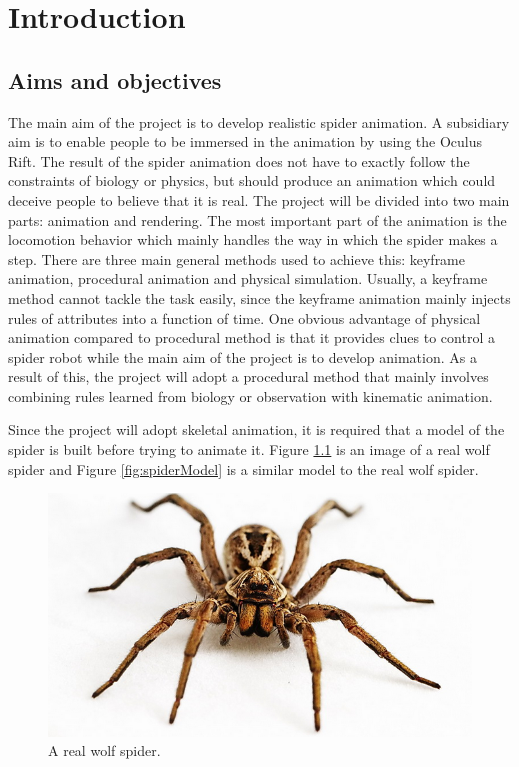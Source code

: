 \chapter{Introduction}
\section{Aims and objectives}
The main aim of the project is to develop realistic spider animation. A subsidiary aim is to enable people to be immersed in the animation by using the Oculus Rift. The result of the spider animation does not have to exactly follow the constraints of biology or physics, but should produce an animation which could deceive people to believe that it is real. 
The project will be divided into two main parts: animation and rendering. 
The most important part of the animation is the locomotion behavior which mainly handles the way in which the spider makes a step. 
There are three main general methods used to achieve this: keyframe animation, procedural animation and physical simulation. Usually, a keyframe method cannot tackle the task easily, since the keyframe animation mainly injects rules of attributes into a function of time.  One obvious advantage of physical animation compared to procedural method is that it provides clues to control a spider robot while the main aim of the project is to develop animation. As a result of this, the project will adopt a procedural method that mainly involves combining rules learned from biology or observation with kinematic animation.  

Since the project will adopt skeletal animation, it is required that a model of the spider is built before trying to animate it. Figure  \ref{fig:realSpider} is an image of a real wolf spider and Figure \ref{fig:spiderModel} is a similar model to the real wolf spider.


\begin{figure}[ht!]
\centering
\includegraphics[width=14cm]{figures/realSpider.png}
\caption{A real wolf spider. \protect\footnotemark}
\label{fig:realSpider}
\end{figure}

